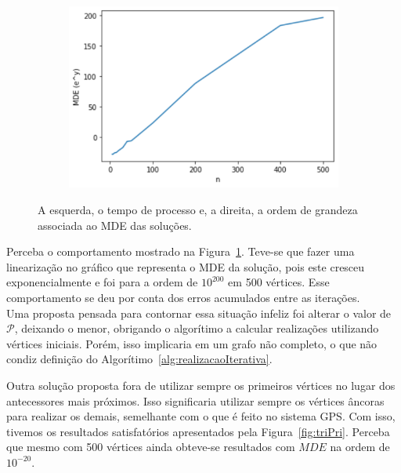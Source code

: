 \documentclass[a4paper,12pt]{report}
\begin{document}
\begin{figure}[H]
\begin{center}
\begin{minipage}{0.45 \linewidth}
				\begin{figure}[H]
					\begin{center}
						\includegraphics[width=1\linewidth]{figures/mdeTri.png}
					\end{center}
				\end{figure}
			\end{minipage}
		\end{center}
		\caption{A esquerda, o tempo de processo e, a direita, a ordem de grandeza associada ao MDE das soluções.}
		\label{fig:tri}
	\end{figure}
	
	Perceba o comportamento mostrado na Figura~\ref{fig:tri}. Teve-se que fazer uma linearização no gráfico que representa o MDE da solução, pois este cresceu exponencialmente e foi para a ordem de $10^{200}$ em 500 vértices. Esse comportamento se deu por conta dos erros acumulados entre as iterações.
	\\
	
	Uma proposta pensada para contornar essa situação infeliz foi alterar o valor de $\mathcal{P}$, deixando o menor, obrigando o algorítimo a calcular realizações utilizando vértices iniciais. Porém, isso implicaria em um grafo não completo, o que não condiz definição do Algorítimo~\ref{alg:realizacaoIterativa}.
	
	Outra solução proposta fora de utilizar sempre os primeiros vértices no lugar dos antecessores mais próximos. Isso significaria utilizar sempre os vértices âncoras para realizar os demais, semelhante com o que é feito no sistema GPS. Com isso, tivemos os resultados satisfatórios apresentados pela Figura~\ref{fig:triPri}. Perceba que mesmo com 500 vértices ainda obteve-se resultados com $MDE$ na ordem de $10^{-20}$.
	
\end{document}
